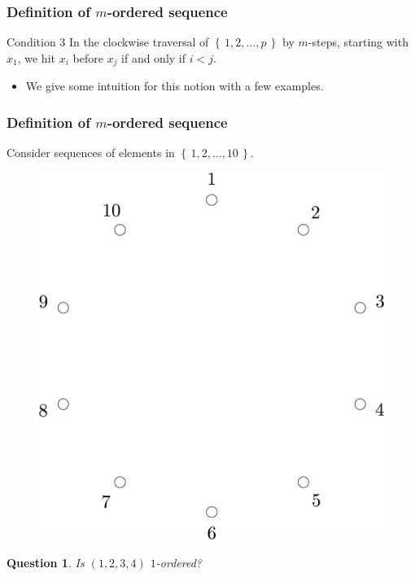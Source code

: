 \documentclass{beamer}
\theoremstyle{plain}
\newtheorem{question}[theorem]{Question}
\theoremstyle{definition}
\theoremstyle{remark}
\renewcommand{\'}{\hspace{0.5mm}'}		%
\renewcommand{\Set}[1]{\left\{\,#1\,\right\}}	%
\begin{document}

\begin{frame}
\frametitle{Definition of $m$-ordered sequence}

	\begin{block}{Condition 3}
		In the clockwise traversal of 
		$\Set{1,2,\hdots, p}$ by
		$m$-steps, starting with $x_1$, we hit $x_i$ before
		$x_j$ if and only if $i < j$. 
	\end{block}
	\begin{itemize}
		\item We give some intuition for this notion
		with a few examples. 
	\end{itemize}
	
\end{frame}


\begin{frame}
\frametitle{Definition of $m$-ordered sequence}

	Consider sequences of elements in $\Set{1,2,\hdots, 10}$. 

	\begin{figure}
		\includegraphics[scale=0.1]{circ_10.jpg}
	\end{figure}
	
	\begin{question}
		Is $(1,2,3,4)$ $1$-ordered?
	\end{question}
	
\end{frame}
\end{document}
